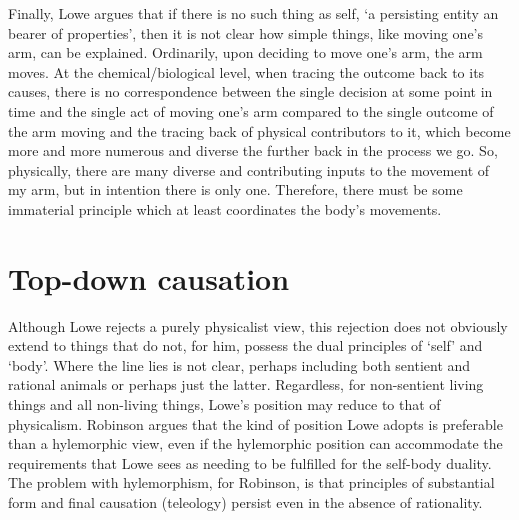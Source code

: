 Finally, Lowe argues that if there is no such thing as self, `a persisting entity an bearer of properties', then it is not clear how simple things, like moving one's arm, can be explained. Ordinarily, upon deciding to move one's arm, the arm moves. At the chemical/biological level, when tracing the outcome back to its causes, there is no correspondence between the single decision at some point in time and the single act of moving one's arm compared to the single outcome of the arm moving and the tracing back of physical contributors to it, which become more and more numerous and diverse the further back in the process we go. So, physically, there are many diverse and contributing inputs to the movement of my arm, but in intention there is only one. Therefore, there must be some immaterial principle which at least coordinates the body's movements.


\section{Top-down causation}

Although Lowe rejects a purely physicalist view, this rejection does not obviously extend to things that do not, for him, possess the dual principles of `self' and `body'. Where the line lies is not clear, perhaps including both sentient and rational animals or perhaps just the latter. Regardless, for non-sentient living things and all non-living things,  Lowe's position may reduce to that of physicalism. Robinson argues that the kind of position Lowe adopts is preferable than a hylemorphic view, even if the hylemorphic position can accommodate the requirements that Lowe sees as needing to be fulfilled for the self-body duality. The problem with hylemorphism, for Robinson, is that principles of substantial form and final causation (teleology) persist even in the absence of rationality.


